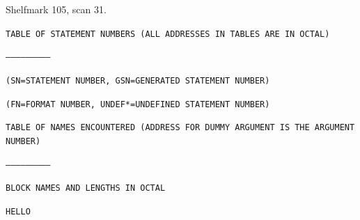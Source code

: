Shelfmark 105, scan 31.



\texttt{TABLE OF STATEMENT NUMBERS (ALL ADDRESSES IN TABLES ARE IN OCTAL)}

\texttt{--------------------------}


\texttt{(SN=STATEMENT NUMBER, GSN=GENERATED STATEMENT NUMBER)}

\texttt{(FN=FORMAT NUMBER, UNDEF*=UNDEFINED STATEMENT NUMBER)}

\texttt{TABLE OF NAMES ENCOUNTERED (ADDRESS FOR DUMMY ARGUMENT IS THE ARGUMENT NUMBER)}

\texttt{--------------------------}


\texttt{BLOCK NAMES AND LENGTHS IN OCTAL}


\texttt{HELLO}

